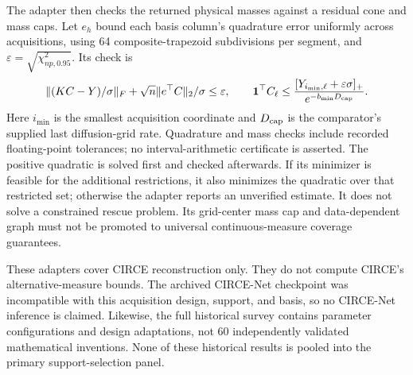 The adapter then checks the returned physical masses against a residual cone and mass caps. Let $e_h$ bound each basis column's quadrature error uniformly across acquisitions, using 64 composite-trapezoid subdivisions per segment, and $\varepsilon=\sqrt{\chi^2_{np,0.95}}$. Its check is
\begin{equation}\label{eq:circecheck}
 \|(KC-Y)/\sigma\|_F+\sqrt n\|e^\top C\|_2/\sigma\leq\varepsilon,
 \qquad \mathbf{1}^\top C_\ell\leq
 \frac{[Y_{i_{\min},\ell}+\varepsilon\sigma]_+}{e^{-b_{\min}D_{\rm cap}}}.
\end{equation}
Here $i_{\min}$ is the smallest acquisition coordinate and $D_{\rm cap}$ is the comparator's supplied last diffusion-grid rate. Quadrature and mass checks include recorded floating-point tolerances; no interval-arithmetic certificate is asserted. The positive quadratic is solved first and checked afterwards. If its minimizer is feasible for the additional restrictions, it also minimizes the quadratic over that restricted set; otherwise the adapter reports an unverified estimate. It does not solve a constrained rescue problem. Its grid-center mass cap and data-dependent graph must not be promoted to universal continuous-measure coverage guarantees.

These adapters cover CIRCE reconstruction only. They do not compute CIRCE's alternative-measure bounds. The archived CIRCE-Net checkpoint was incompatible with this acquisition design, support, and basis, so no CIRCE-Net inference is claimed. Likewise, the full historical survey contains parameter configurations and design adaptations, not 60 independently validated mathematical inventions. None of these historical results is pooled into the primary support-selection panel.
